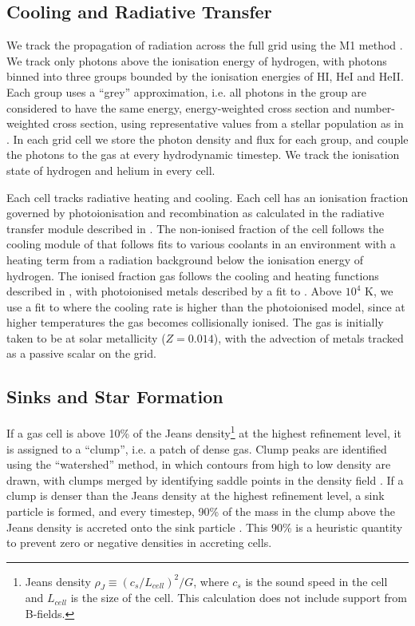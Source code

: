 \documentclass[a4paper,fleqn,usenatbib]{mnras}
\begin{document}
\subsection{Cooling and Radiative Transfer}
\label{methods:cooling}

We track the propagation of radiation across the full \AMR grid using the M1 method \citep{Rosdahl2013}. We track only photons above the ionisation energy of hydrogen, with photons binned into three groups bounded by the ionisation energies of HI, HeI and HeII. Each group uses a ``grey'' approximation, i.e. all photons in the group are considered to have the same energy, energy-weighted cross section and number-weighted cross section, using representative values from a stellar population as in \citet{Geen2017}. In each grid cell we store the photon density and flux for each group, and couple the photons to the gas at every hydrodynamic timestep. We track the ionisation state of hydrogen and helium in every \AMR cell.

Each cell tracks radiative heating and cooling. Each cell has an ionisation fraction governed by photoionisation and recombination as calculated in the radiative transfer module described in \citet{Rosdahl2013}. The non-ionised fraction of the cell follows the cooling module of \citet{Audit2005} that follows fits to various coolants in an \ISM environment with a heating term from a radiation background below the ionisation energy of hydrogen. The ionised fraction gas follows the cooling and heating functions described in \citet{Rosdahl2013}, with photoionised metals described by a fit to \citet{Ferland2003}. Above $10^4$ K, we use a fit to \citet{Sutherland1993} where the cooling rate is higher than the photoionised model, since at higher temperatures the gas becomes collisionally ionised. The gas is initially taken to be at solar metallicity ($Z = 0.014$), with the advection of metals tracked as a passive scalar on the \AMR grid.

\subsection{Sinks and Star Formation}

If a gas cell is above 10\% of the Jeans density\footnote{Jeans density $\rho_J \equiv (c_s/L_{cell})^2/G$, where $c_s$ is the sound speed in the cell and $L_{cell}$ is the size of the cell. This calculation does not include support from B-fields.} at the highest refinement level, it is assigned to a ``clump'', i.e. a patch of dense gas. Clump peaks are identified using the ``watershed'' method, in which contours from high to low density are drawn, with clumps merged by identifying saddle points in the density field \citep{Bleuler2014}. If a clump is denser than the Jeans density at the highest refinement level, a sink particle is formed, and every timestep, 90\% of the mass in the clump above the Jeans density is accreted onto the sink particle \citep{Bleuler2014a}. This 90\% is a heuristic quantity to prevent zero or negative densities in accreting cells.
\end{document}
